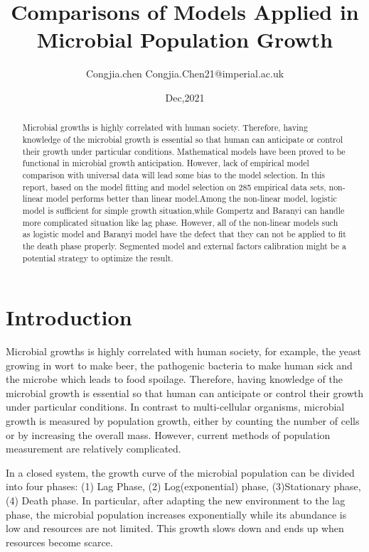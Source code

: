 \documentclass[11pt]{article}
\title{Comparisons of Models Applied in Microbial Population Growth}
\author{Congjia.chen Congjia.Chen21@imperial.ac.uk}
\date{Dec,2021}
\begin{document}
  \maketitle
  
  \begin{abstract}
    Microbial growths is highly correlated with human society. Therefore, having knowledge of the microbial growth is essential so that human can anticipate or control their growth under particular conditions. Mathematical models have been proved to be functional in microbial growth anticipation. However, lack of empirical model comparison with universal data will lead some bias to the model selection. In this report, based on the model fitting and model selection on 285 empirical data sets,  non-linear model performs better than linear model.Among the non-linear model, logistic model is sufficient for simple growth situation,while Gompertz and Baranyi can handle more complicated situation like lag phase. However, all of the non-linear models such as logistic model and Baranyi model have the defect that they can not be applied to fit the death phase properly. Segmented model and external factors calibration might be a potential strategy to optimize the result.
  \end{abstract}
  
  \section{Introduction}
  Microbial growths is highly correlated with human society, for example, the yeast growing in wort to make beer, the pathogenic bacteria to make human sick and the microbe which leads to food spoilage. Therefore, having knowledge of the microbial growth is essential so that human can anticipate or control their growth under particular conditions\cite{shoemaker_microbial_2021}. In contrast to multi-cellular organisms, microbial growth is measured by population growth, either by counting the number of cells or by increasing the overall mass. However, current methods of population measurement are relatively complicated\cite{egli_microbial_2015}.
   
  In a closed system, the growth curve of the microbial population can be divided into four phases: (1) Lag Phase, (2) Log(exponential) phase, (3)Stationary phase, (4) Death phase\cite{peleg_microbial_2011}. In particular, after adapting the new environment to the lag phase, the microbial population increases exponentially while its abundance is low and resources are not limited. This growth slows down and ends up when resources become scarce.
 
\end{document}
